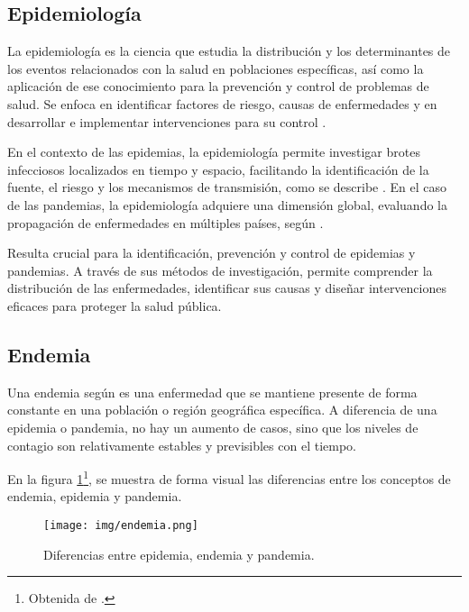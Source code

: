 \subsection{Epidemiología}
La epidemiología es la ciencia que estudia la distribución y los determinantes de los eventos relacionados con la salud en poblaciones específicas, así como la aplicación de ese conocimiento para la prevención y control de problemas de salud. Se enfoca en identificar factores de riesgo, causas de enfermedades y en desarrollar e implementar intervenciones para su control \cite{hajat2010introduction}.

En el contexto de las epidemias, la epidemiología permite investigar brotes infecciosos localizados en tiempo y espacio, facilitando la identificación de la fuente, el riesgo y los mecanismos de transmisión, como se describe \cite{riley2019differentiating}. En el caso de las pandemias, la epidemiología adquiere una dimensión global, evaluando la propagación de enfermedades en múltiples países, según \cite{piret2021pandemics}. 

Resulta crucial para la identificación, prevención y control de epidemias y pandemias. A través de sus métodos de investigación, permite comprender la distribución de las enfermedades, identificar sus causas y diseñar intervenciones eficaces para proteger la salud pública.

\subsection{Endemia}
Una endemia según \cite{ranm_endemia} es una enfermedad que se mantiene presente de forma constante en una población o región geográfica específica. A diferencia de una epidemia o pandemia, no hay un aumento de casos, sino que los niveles de contagio son relativamente estables y previsibles con el tiempo.

En la figura \ref{fig:difernecias}\footnote{Obtenida de \cite{rie2020covid}.}, se muestra de forma visual las diferencias entre los conceptos de endemia, epidemia y pandemia.


\begin{figure}[H]
        \centering
        \texttt{[image: img/endemia.png]}
        \caption{Diferencias entre epidemia, endemia y pandemia.}
        \label{fig:difernecias}
        \vspace{0.5cm} %
    \end{figure}


